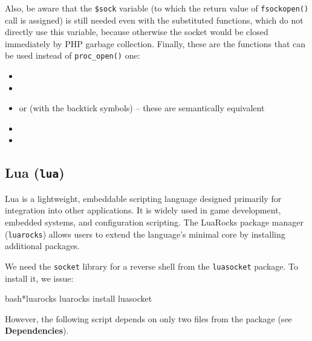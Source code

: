 Also, be aware that the \texttt{\$sock} variable (to which the return value of \texttt{fsockopen()} call is assigned) is still needed even with the substituted functions, which do not directly use this variable, because otherwise the socket would be closed immediately by PHP garbage collection. Finally, these are the functions that can be used instead of \texttt{proc\_open()} one:

\begin{itemize}

\item {}
\item {}
\item {} or  (with the backtick symbols) -- these are semantically equivalent
\item {}
\item {}

\end{itemize}


\subsection{Lua (\texttt{lua})}


Lua is a lightweight, embeddable scripting language designed primarily for integration into other applications. It is widely used in game development, embedded systems, and configuration scripting. The LuaRocks package manager (\texttt{luarocks}) allows users to extend the language's minimal core by installing additional packages.

We need the \texttt{socket} library for a reverse shell from the \texttt{luasocket} package. To install it, we issue:

\begin{cmdline}{bash}{*}{luarocks}{}
luarocks install luasocket
\end{cmdline}

However, the following script depends on only two files from the package (see \textbf{Dependencies}).


